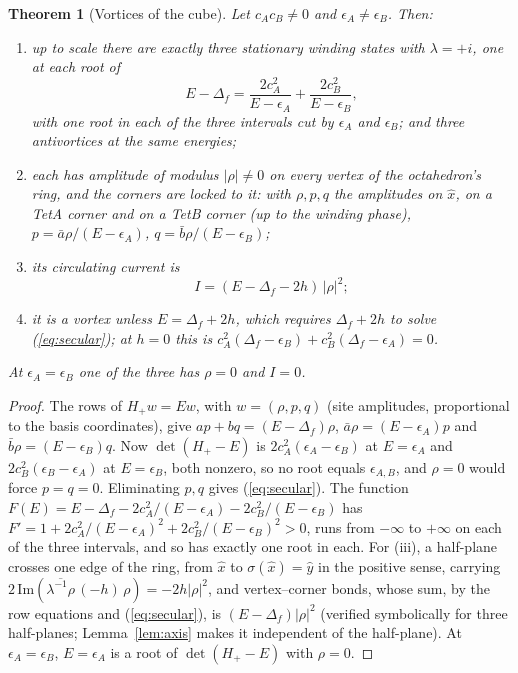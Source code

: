 \documentclass[twocolumn]{iopjournal}
\newtheorem{theorem}{Theorem}
\theoremstyle{definition}
\theoremstyle{remark}
\begin{document}
\begin{theorem}[Vortices of the cube]
\label{thm:cube}
Let $c_Ac_B \neq 0$ and $\epsilon_A \neq \epsilon_B$. Then:
\begin{enumerate}
\item[(i)] up to scale there are exactly three stationary winding
  states with $\lambda = +i$, one at each root of
  \begin{equation}
  E - \Delta_f = \frac{2c_A^2}{E - \epsilon_A} + \frac{2c_B^2}{E - \epsilon_B},
  \label{eq:secular}
  \end{equation}
  with one root in each of the three intervals cut by $\epsilon_A$ and
  $\epsilon_B$; and three antivortices at the same energies;
\item[(ii)] each has amplitude of modulus $\lvert\rho\rvert \neq 0$ on
  every vertex of the octahedron's ring, and the corners are locked to
  it: with $\rho, p, q$ the amplitudes on $\hat x$, on a TetA corner and
  on a TetB corner (up to the winding phase),
  $p = \bar a\rho/(E - \epsilon_A)$, $q = \bar b\rho/(E - \epsilon_B)$;
\item[(iii)] its circulating current is
  \begin{equation}
  I = (E - \Delta_f - 2h)\,\lvert\rho\rvert^2 ;
  \label{eq:current}
  \end{equation}
\item[(iv)] it is a vortex unless $E = \Delta_f + 2h$, which requires
  $\Delta_f + 2h$ to solve (\ref{eq:secular}); at $h = 0$ this is
  $c_A^2(\Delta_f - \epsilon_B) + c_B^2(\Delta_f - \epsilon_A) = 0$.
\end{enumerate}
At $\epsilon_A = \epsilon_B$ one of the three has $\rho = 0$ and
$I = 0$.
\end{theorem}

\begin{proof}
The rows of $H_+w = Ew$, with $w = (\rho, p, q)$ (site amplitudes,
proportional to the basis coordinates), give
$a p + b q = (E - \Delta_f)\rho$, $\bar a\rho = (E - \epsilon_A)p$ and
$\bar b\rho = (E - \epsilon_B)q$. Now $\det(H_+ - E)$ is
$2c_A^2(\epsilon_A - \epsilon_B)$ at $E = \epsilon_A$ and
$2c_B^2(\epsilon_B - \epsilon_A)$ at $E = \epsilon_B$, both nonzero, so
no root equals $\epsilon_{A,B}$, and $\rho = 0$ would force
$p = q = 0$. Eliminating $p, q$ gives (\ref{eq:secular}). The function
$F(E) = E - \Delta_f - 2c_A^2/(E-\epsilon_A) - 2c_B^2/(E-\epsilon_B)$
has $F' = 1 + 2c_A^2/(E-\epsilon_A)^2 + 2c_B^2/(E-\epsilon_B)^2 > 0$,
runs from $-\infty$ to $+\infty$ on each of the three intervals, and
so has exactly one root in each. For (iii), a half-plane crosses one
edge of the ring, from $\hat x$ to $\sigma(\hat x) = \hat y$ in the
positive sense, carrying
$2\,\mathrm{Im}(\overline{\lambda^{-1}\rho}\,(-h)\,\rho) = -2h\lvert\rho\rvert^2$,
and vertex--corner bonds, whose sum, by the row equations and
(\ref{eq:secular}), is $(E - \Delta_f)\lvert\rho\rvert^2$ (verified
symbolically for three half-planes; Lemma~\ref{lem:axis} makes it
independent of the half-plane). At $\epsilon_A = \epsilon_B$,
$E = \epsilon_A$ is a root of $\det(H_+ - E)$ with $\rho = 0$.
\end{proof}
\end{document}
